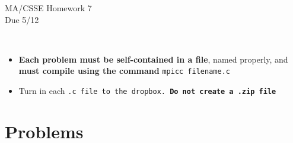 \documentclass{article}
\begin{document}
\begin{center}
\Large{MA/CSSE Homework 7}\\
Due 5/12
\end{center}
\vspace{.25in}
\\
  \begin{itemize}
   \item \textbf{Each problem must be self-contained in a file}, named
     properly, and \textbf{must compile using the
      command} \texttt{mpicc filename.c}\\

  \item Turn in each \tt{.c} file to the dropbox. \textbf{Do not
      create a \tt{.zip} file}

  \end{itemize}


\section*{Problems}
\end{document}
